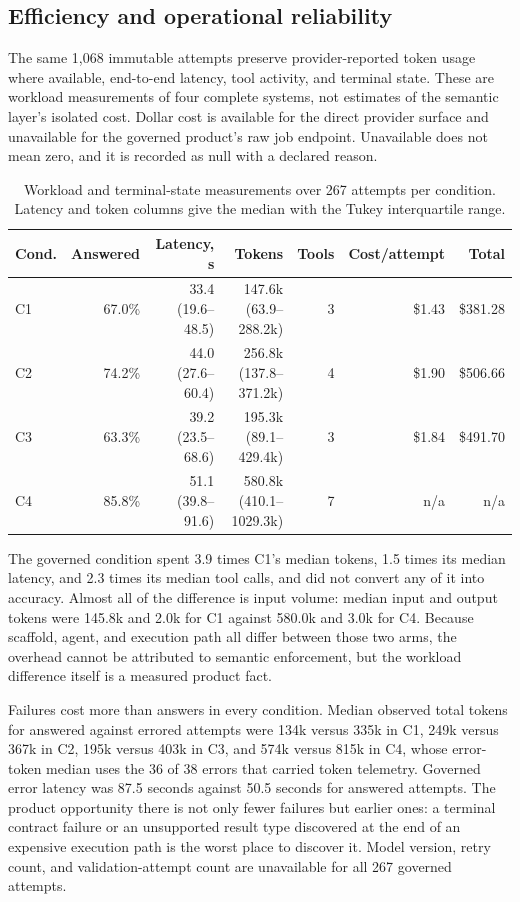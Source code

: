 \subsection{Efficiency and operational reliability}

The same 1,068 immutable attempts preserve provider-reported token usage where
available, end-to-end latency, tool activity, and terminal state. These are
workload measurements of four complete systems, not estimates of the semantic
layer's isolated cost. Dollar cost is available for the direct provider surface
and unavailable for the governed product's raw job endpoint. Unavailable does not
mean zero, and it is recorded as null with a declared reason.

\begin{table}[htbp]
\centering
\caption{Workload and terminal-state measurements over 267 attempts per
condition. Latency and token columns give the median with the Tukey interquartile
range.}
\label{tab:efficiency}
\begin{tabular}{lrrrrrr}
\toprule
Cond. & Answered & Latency, s & Tokens & Tools & Cost/attempt & Total \\
\midrule
C1 & 67.0\% & 33.4 (19.6--48.5) & 147.6k (63.9--288.2k) & 3 & \$1.43 & \$381.28 \\
C2 & 74.2\% & 44.0 (27.6--60.4) & 256.8k (137.8--371.2k) & 4 & \$1.90 & \$506.66 \\
C3 & 63.3\% & 39.2 (23.5--68.6) & 195.3k (89.1--429.4k) & 3 & \$1.84 & \$491.70 \\
C4 & 85.8\% & 51.1 (39.8--91.6) & 580.8k (410.1--1029.3k) & 7 & n/a & n/a \\
\bottomrule
\end{tabular}
\end{table}

The governed condition spent 3.9 times C1's median tokens, 1.5 times its median
latency, and 2.3 times its median tool calls, and did not convert any of it into
accuracy. Almost all of the difference is input volume: median input and output
tokens were 145.8k and 2.0k for C1 against 580.0k and 3.0k for C4. Because
scaffold, agent, and execution path all differ between those two arms, the
overhead cannot be attributed to semantic enforcement, but the workload
difference itself is a measured product fact.

Failures cost more than answers in every condition. Median observed total tokens
for answered against errored attempts were 134k versus 335k in C1, 249k versus
367k in C2, 195k versus 403k in C3, and 574k versus 815k in C4, whose error-token
median uses the 36 of 38 errors that carried token telemetry. Governed error
latency was 87.5 seconds against 50.5 seconds for answered attempts. The product
opportunity there is not only fewer failures but earlier ones: a terminal
contract failure or an unsupported result type discovered at the end of an
expensive execution path is the worst place to discover it. Model version, retry
count, and validation-attempt count are unavailable for all 267 governed
attempts.

